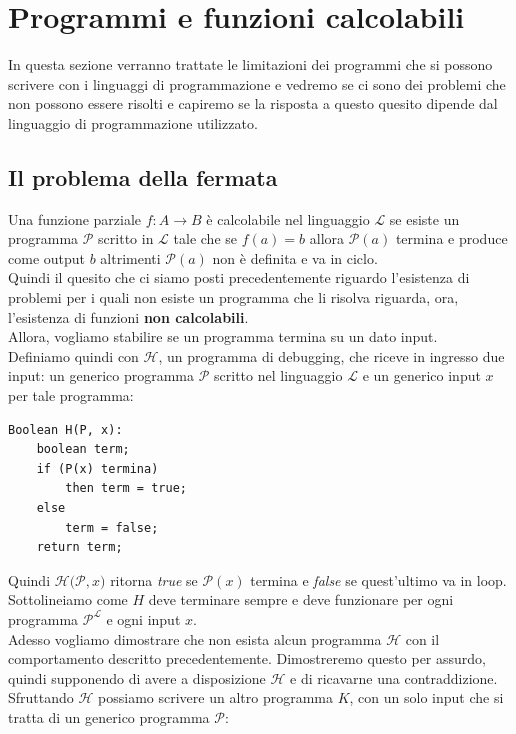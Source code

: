 \documentclass[12pt]{report}
\begin{document}
	\section{Programmi e funzioni calcolabili}
	In questa sezione verranno trattate le limitazioni dei programmi che si possono scrivere con i linguaggi di programmazione e vedremo se ci sono dei problemi che non possono essere risolti e capiremo se la risposta a questo quesito dipende dal linguaggio di programmazione utilizzato.
	\subsection{Il problema della fermata}
	Una funzione parziale $f: A \to B$ è calcolabile nel linguaggio $\mathcal{L}$ se esiste un programma $\mathcal{P}$ scritto in $\mathcal{L}$ tale che se $f(a) = b$ allora $\mathcal{P}(a)$ termina e produce come output $b$ altrimenti $\mathcal{P}(a)$ non è definita e va in ciclo.  \\
	Quindi il quesito che ci siamo posti precedentemente riguardo l'esistenza di problemi per i quali non esiste un programma che li risolva riguarda, ora, l'esistenza di funzioni \textbf{non calcolabili}.  \\
	Allora, vogliamo stabilire se un programma termina su un dato input. \\
	Definiamo quindi con $\mathcal{H}$, un programma di debugging, che riceve in ingresso due input: un generico programma $\mathcal{P}$ scritto nel linguaggio $\mathcal{L}$ e un generico input $x$ per tale programma: \\
	\begin{lstlisting}[style=pascalstyle]
Boolean H(P, x):
	boolean term;
	if (P(x) termina)
	 	then term = true;
	else
		term = false;
	return term;
	\end{lstlisting}
	Quindi $\mathcal{H(P}, x)$ ritorna \textit{true} se $\mathcal{P}(x)$ termina e \textit{false} se quest'ultimo va in loop. \\
	Sottolineiamo come $H$ deve terminare sempre e deve funzionare per ogni programma $\mathcal{P^L}$ e ogni input $x$. \\
	Adesso vogliamo dimostrare che non esista alcun programma $\mathcal{H}$ con il comportamento descritto precedentemente. Dimostreremo questo per assurdo, quindi supponendo di avere a disposizione $\mathcal{H}$ e di ricavarne una contraddizione. \\
	Sfruttando $\mathcal{H}$ possiamo scrivere un altro programma $K$, con un solo input che si tratta di un generico programma $\mathcal{P}$:
\end{document}
